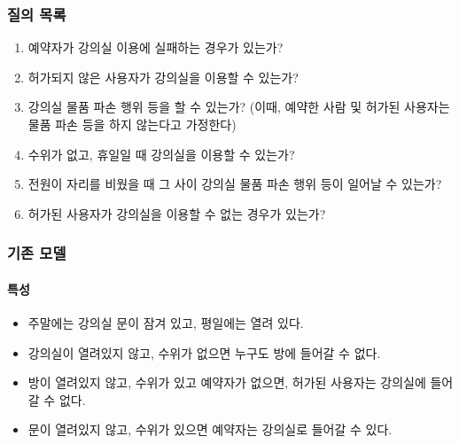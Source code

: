 \documentclass[11pt,a4paper]{article}
\begin{document}
\subsubsection{질의 목록}
\begin{enumerate}
\item 예약자가 강의실 이용에 실패하는 경우가 있는가?
\item 허가되지 않은 사용자가 강의실을 이용할 수 있는가?
\item 강의실 물품 파손 행위 등을 할 수 있는가? (이때, 예약한 사람 및 허가된
사용자는 물품 파손 등을 하지 않는다고 가정한다)
\item 수위가 없고, 휴일일 때 강의실을 이용할 수 있는가?
\item 전원이 자리를 비웠을 때 그 사이 강의실 물품 파손 행위 등이 일어날 수
있는가?
\item 허가된 사용자가 강의실을 이용할 수 없는 경우가 있는가?
\end{enumerate}

\subsubsection{기존 모델}

\paragraph{특성}
\begin{itemize}
\item 주말에는 강의실 문이 잠겨 있고, 평일에는 열려 있다.
\item 강의실이 열려있지 않고, 수위가 없으면 누구도 방에 들어갈 수 없다.
\item 방이 열려있지 않고, 수위가 있고 예약자가 없으면, 허가된 사용자는 강의실에
들어갈 수 없다.
\item 문이 열려있지 않고, 수위가 있으면 예약자는 강의실로 들어갈 수 있다.
\end{itemize}
\end{document}
